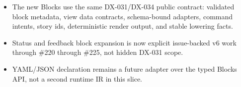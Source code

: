 \begin{itemize}
  The public package barrel exposes the matching lower-camel definitions: \texttt{i\allowbreak{}n\allowbreak{}l\allowbreak{}i\allowbreak{}n\allowbreak{}e\allowbreak{}S\allowbreak{}t\allowbreak{}a\allowbreak{}t\allowbreak{}u\allowbreak{}s\allowbreak{}B\allowbreak{}l\allowbreak{}o\allowbreak{}c\allowbreak{}k}, \texttt{i\allowbreak{}n\allowbreak{}F\allowbreak{}l\allowbreak{}o\allowbreak{}w\allowbreak{}S\allowbreak{}t\allowbreak{}a\allowbreak{}t\allowbreak{}u\allowbreak{}s\allowbreak{}B\allowbreak{}l\allowbreak{}o\allowbreak{}c\allowbreak{}k}, \texttt{t\allowbreak{}r\allowbreak{}a\allowbreak{}n\allowbreak{}s\allowbreak{}i\allowbreak{}e\allowbreak{}n\allowbreak{}t\allowbreak{}O\allowbreak{}v\allowbreak{}e\allowbreak{}r\allowbreak{}l\allowbreak{}a\allowbreak{}y\allowbreak{}B\allowbreak{}l\allowbreak{}o\allowbreak{}c\allowbreak{}k}, \texttt{a\allowbreak{}c\allowbreak{}t\allowbreak{}i\allowbreak{}v\allowbreak{}i\allowbreak{}t\allowbreak{}y\allowbreak{}S\allowbreak{}t\allowbreak{}r\allowbreak{}e\allowbreak{}a\allowbreak{}m\allowbreak{}B\allowbreak{}l\allowbreak{}o\allowbreak{}c\allowbreak{}k}, \texttt{s\allowbreak{}h\allowbreak{}o\allowbreak{}r\allowbreak{}t\allowbreak{}c\allowbreak{}u\allowbreak{}t\allowbreak{}C\allowbreak{}u\allowbreak{}e\allowbreak{}B\allowbreak{}l\allowbreak{}o\allowbreak{}c\allowbreak{}k}, and \texttt{p\allowbreak{}r\allowbreak{}o\allowbreak{}g\allowbreak{}r\allowbreak{}e\allowbreak{}s\allowbreak{}s\allowbreak{}I\allowbreak{}n\allowbreak{}d\allowbreak{}i\allowbreak{}c\allowbreak{}a\allowbreak{}t\allowbreak{}o\allowbreak{}r\allowbreak{}B\allowbreak{}l\allowbreak{}o\allowbreak{}c\allowbreak{}k}, plus matching \texttt{*\allowbreak{}S\allowbreak{}c\allowbreak{}h\allowbreak{}e\allowbreak{}m\allowbreak{}a\allowbreak{}A\allowbreak{}d\allowbreak{}a\allowbreak{}p\allowbreak{}t\allowbreak{}e\allowbreak{}r} and \texttt{*\allowbreak{}S\allowbreak{}c\allowbreak{}h\allowbreak{}e\allowbreak{}m\allowbreak{}a\allowbreak{}B\allowbreak{}l\allowbreak{}o\allowbreak{}c\allowbreak{}k} exports.
\item
  The new Blocks use the same DX-031/DX-034 public contract: validated block metadata, view data contracts, schema-bound adapters, command intents, story ids, deterministic render output, and stable lowering facts.
\item
  Status and feedback block expansion is now explicit issue-backed v6 work through \#220 through \#225, not hidden DX-031 scope.
\item
  YAML/JSON declaration remains a future adapter over the typed Blocks API, not a second runtime IR in this slice.
\end{itemize}

